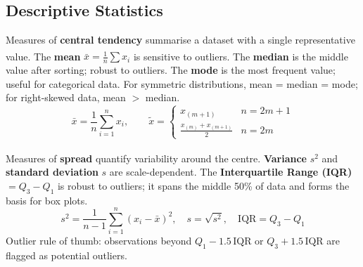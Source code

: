     \subsection{Descriptive Statistics}
    \begin{tcbitemize}[ skin=sectionraster ]

        \tcbitem[title={Central Tendency}, raster multicolumn=6]
        Measures of \textbf{central tendency} summarise a dataset with a single representative value\textsuperscript{\cite{brucePracticalStatisticsData2017}}. The \textbf{mean} $\bar{x} = \frac{1}{n}\sum x_i$ is sensitive to outliers. The \textbf{median} is the middle value after sorting; robust to outliers. The \textbf{mode} is the most frequent value; useful for categorical data. For symmetric distributions, mean = median = mode; for right-skewed data, mean $>$ median.
        \tcblower
        \begin{equation}
            \bar{x} = \frac{1}{n}\sum_{i=1}^n x_i, \qquad
            \tilde{x} = \begin{cases} x_{(m+1)} & n = 2m+1 \\ \frac{x_{(m)} + x_{(m+1)}}{2} & n = 2m \end{cases}
        \end{equation}

        \tcbitem[title={Spread}, raster multicolumn=6]
        Measures of \textbf{spread} quantify variability around the centre\textsuperscript{\cite{brucePracticalStatisticsData2017}}. \textbf{Variance} $s^2$ and \textbf{standard deviation} $s$ are scale-dependent. The \textbf{Interquartile Range (IQR)} $= Q_3 - Q_1$ is robust to outliers; it spans the middle 50\% of data and forms the basis for box plots.
        \tcblower
        \begin{equation}
            s^2 = \frac{1}{n-1}\sum_{i=1}^n (x_i - \bar{x})^2, \quad
            s = \sqrt{s^2}, \quad
            \mathrm{IQR} = Q_3 - Q_1
        \end{equation}
        Outlier rule of thumb: observations beyond $Q_1 - 1.5\,\mathrm{IQR}$ or $Q_3 + 1.5\,\mathrm{IQR}$ are flagged as potential outliers.

    \end{tcbitemize}

